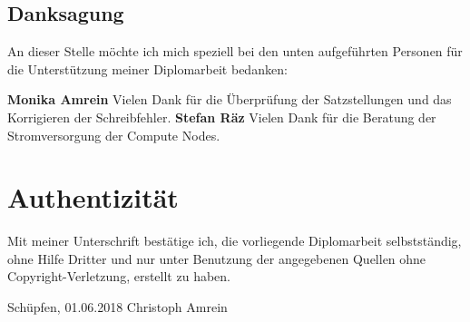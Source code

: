 \subsection{Danksagung}
An dieser Stelle möchte ich mich speziell bei den unten aufgeführten Personen für die Unterstützung meiner Diplomarbeit bedanken:

\textbf{Monika Amrein}\newline
Vielen Dank für die Überprüfung der Satzstellungen und das Korrigieren der Schreibfehler.\newline
\textbf{Stefan Räz}\newline
Vielen Dank für die Beratung der Stromversorgung der Compute Nodes.

\newpage
\section{Authentizität}
Mit meiner Unterschrift bestätige ich, die vorliegende Diplomarbeit selbstständig, ohne Hilfe Dritter und nur unter Benutzung der angegebenen Quellen ohne Copyright-Verletzung, erstellt zu haben.

Schüpfen, 01.06.2018\newline
\newline
\newline
Christoph Amrein

